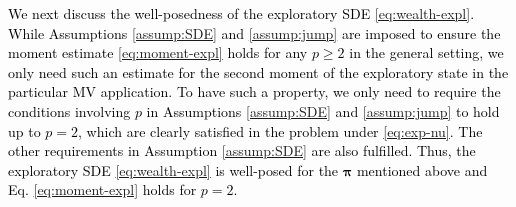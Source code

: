 \documentclass[11pt]{article}
\newcommand{\1}{\mathbbm{1}}
\newcommand{\bpi}{\boldsymbol{\pi}}
\newcommand{\rev}[1]{\textcolor{black}{{#1}}} %
\begin{document}
\rev{
We next discuss the well-posedness of the exploratory SDE \eqref{eq:wealth-expl}. While Assumptions \ref{assump:SDE} and \ref{assump:jump} are imposed to ensure the moment estimate \eqref{eq:moment-expl} holds for any $p\geq 2$ in the general setting, we only need such an estimate for the second moment of the exploratory state in the particular MV application. To have such a property, we only need to require the conditions involving $p$ in Assumptions \ref{assump:SDE} and \ref{assump:jump} to hold up to $p=2$, which are clearly satisfied in the problem under \eqref{eq:exp-nu}. The other requirements in Assumption \ref{assump:SDE} are also fulfilled.  Thus, the exploratory SDE \eqref{eq:wealth-expl} is well-posed for the $\bpi$ mentioned above and Eq. \eqref{eq:moment-expl} holds for $p=2$. }
\end{document}
